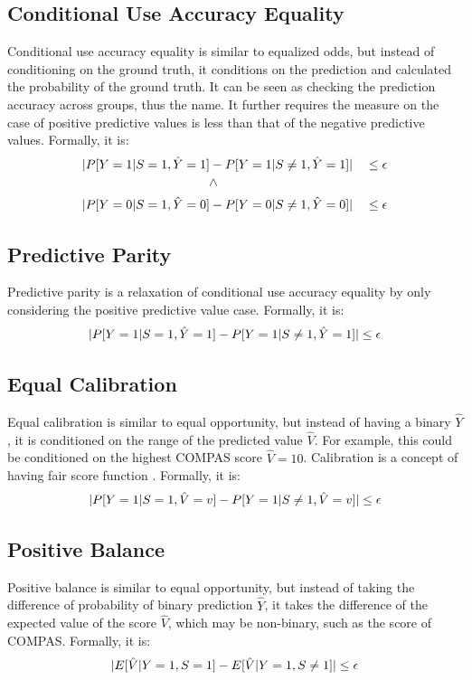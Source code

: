 \documentclass[conference]{IEEEtran}
\begin{document}
\subsection{Conditional Use Accuracy Equality}
Conditional use accuracy equality \cite{berk2021fairness} is similar to equalized odds, but instead of conditioning on the ground truth, it conditions on the prediction and calculated the probability of the ground truth. It can be seen as checking the prediction accuracy across groups, thus the name. It further requires the measure on the case of positive predictive values is less than that of the negative predictive values. Formally, it is:
\begin{align*}
    \abs{P[Y = 1 | S = 1, \hat{Y} = 1] & - P[Y = 1 | S \neq 1, \hat{Y} = 1]} && \leq \epsilon \\
    & \rotatebox{90}{>} && \\
    \abs{P[Y = 0 | S = 1, \hat{Y} = 0] & - P[Y = 0 | S \neq 1, \hat{Y} = 0]} && \leq \epsilon
\end{align*}

\subsection{Predictive Parity}
Predictive parity \cite{chouldechova2017fair} is a relaxation of conditional use accuracy equality by only considering the positive predictive value case. Formally, it is:
\begin{align*}
    \lvert P[Y = 1 | S = 1, \hat{Y} = 1] - P[Y = 1 | S \neq 1, \hat{Y} = 1]\rvert \leq \epsilon
\end{align*}

\subsection{Equal Calibration}
Equal calibration \cite{chouldechova2017fair} is similar to equal opportunity, but instead of having a binary $\hat{Y}$, it is conditioned on the range of the predicted value $\hat{V}$. For example, this could be conditioned on the highest COMPAS score $\hat{V} = 10$. Calibration is a concept of having fair score function \cite{fraenkel2020fairness}. Formally, it is:
\begin{align*}
    \lvert P[Y = 1 | S = 1, \hat{V} = v] - P[Y = 1 | S \neq 1, \hat{V} = v]\rvert \leq \epsilon
\end{align*}

\subsection{Positive Balance}
Positive balance \cite{kleinberg2016inherent} is similar to equal opportunity, but instead of taking the difference of probability of binary prediction $\hat{Y}$, it takes the difference of the expected value of the score $\hat{V}$, which may be non-binary, such as the score of COMPAS. Formally, it is:
\begin{align*}
    \lvert E[\hat{V} | Y = 1, S = 1] - E[\hat{V} | Y = 1, S \neq 1]\rvert \leq \epsilon
\end{align*}
\end{document}
